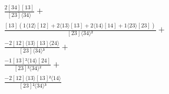 \documentclass[varwidth, border=5pt]{standalone}
\begin{document}
\begin{my}
$\begin{gathered}
\scriptscriptstyle\frac{2[34][13]}{[23]⟨34⟩} +\\
\scriptscriptstyle\frac{[13](1⟨12⟩[12]+2⟨13⟩[13]+2⟨14⟩[14]+1⟨23⟩[23])}{[23]⟨34⟩²} +\\
\scriptscriptstyle\frac{-2[12]⟨13⟩[13]⟨24⟩}{[23]⟨34⟩³} +\\
\scriptscriptstyle\frac{-1[13]²⟨14⟩[24]}{[23]²⟨34⟩²} +\\
\scriptscriptstyle\frac{-2[12]⟨13⟩[13]²⟨14⟩}{[23]²⟨34⟩³} \phantom{+}
\end{gathered}$
\end{my}
\end{document}
